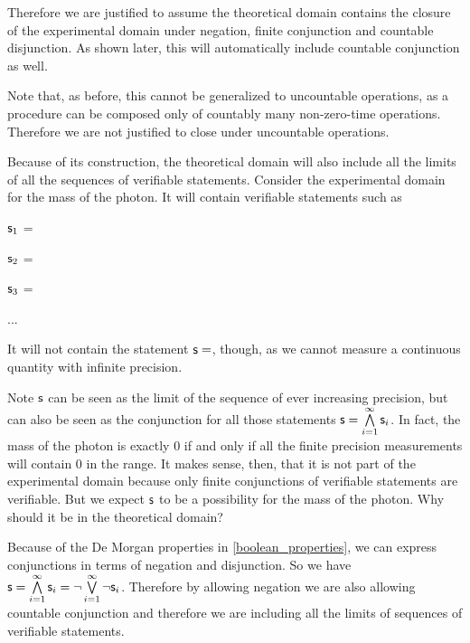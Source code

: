 \documentclass[11pt,letterpaper,fleqn]{memoir} %
\begin{document}
\begin{mathSection}
\begin{justification}
	Therefore we are justified to assume the theoretical domain contains the closure of the experimental domain under negation, finite conjunction and countable disjunction. As shown later, this will automatically include countable conjunction as well.
	
	Note that, as before, this cannot be generalized to uncountable operations, as a procedure can be composed only of countably many non-zero-time operations. Therefore we are not justified to close under uncountable operations.
\end{justification}
\end{mathSection}

Because of its construction, the theoretical domain will also include all the limits of all the sequences of verifiable statements. Consider the experimental domain for the mass of the photon. It will contain verifiable statements such as
\begin{description}
	\item $\mathsf{s}_1$ =
	\item $\mathsf{s}_2$ =
	\item $\mathsf{s}_3$ =
	\item ...
\end{description}
It will not contain the statement $\mathsf{s}=$, though, as we cannot measure a continuous quantity with infinite precision.

Note $\mathsf{s}$ can be seen as the limit of the sequence of ever increasing precision, but can also be seen as the conjunction for all those statements $\mathsf{s}=\bigwedge\limits_{i=1}^{\infty} \mathsf{s}_i$. In fact, the mass of the photon is exactly 0 if and only if all the finite precision measurements will contain 0 in the range. It makes sense, then, that it is not part of the experimental domain because only finite conjunctions of verifiable statements are verifiable. But we expect $\mathsf{s}$ to be a possibility for the mass of the photon. Why should it be in the theoretical domain?

Because of the De Morgan properties in \ref{boolean_properties}, we can express conjunctions in terms of negation and disjunction. So we have $\mathsf{s}=\bigwedge\limits_{i=1}^{\infty} \mathsf{s}_i=\neg \bigvee\limits_{i=1}^{\infty} \neg\mathsf{s}_i$. Therefore by allowing negation we are also allowing countable conjunction and therefore we are including all the limits of sequences of verifiable statements.
\end{document}
